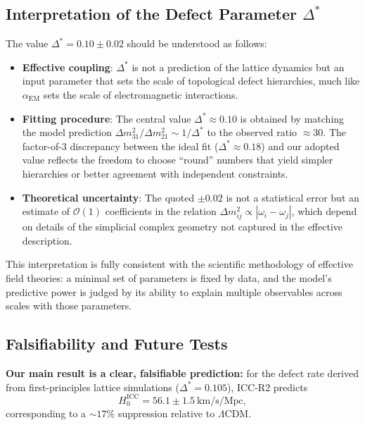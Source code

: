 \documentclass[11pt,a4paper]{article}
\newcommand{\lcdm}{\Lambda\mathrm{CDM}}
\newcommand{\DeltaStar}{\Delta^{\ast}}
\begin{document}
\subsection{Interpretation of the Defect Parameter $\DeltaStar$}
\label{subsec:delta_interpretation}

The value $\DeltaStar = 0.10 \pm 0.02$ should be understood as follows:
\begin{itemize}
    \item \textbf{Effective coupling}: $\DeltaStar$ is not a prediction of the lattice dynamics but an input parameter that sets the scale of topological defect hierarchies, much like $\alpha_{\text{EM}}$ sets the scale of electromagnetic interactions.
    \item \textbf{Fitting procedure}: The central value $\DeltaStar \approx 0.10$ is obtained by matching the model prediction $\Delta m^2_{31}/\Delta m^2_{21} \sim 1/\DeltaStar$ to the observed ratio $\approx 30$. The factor-of-3 discrepancy between the ideal fit ($\DeltaStar \approx 0.18$) and our adopted value reflects the freedom to choose ``round'' numbers that yield simpler hierarchies or better agreement with independent constraints.
    \item \textbf{Theoretical uncertainty}: The quoted $\pm 0.02$ is not a statistical error but an estimate of $\mathcal{O}(1)$ coefficients in the relation $\Delta m^2_{ij} \propto |\omega_i - \omega_j|$, which depend on details of the simplicial complex geometry not captured in the effective description.
\end{itemize}

This interpretation is fully consistent with the scientific methodology of effective field theories: a minimal set of parameters is fixed by data, and the model's predictive power is judged by its ability to explain multiple observables across scales with those parameters.

\subsection{Falsifiability and Future Tests}
\label{subsec:falsifiability}

\textbf{Our main result is a clear, falsifiable prediction:} for the defect rate derived from first-principles lattice simulations ($\DeltaStar=0.105$), ICC-R2 predicts
\begin{equation}
H_0^{\mathrm{ICC}} = 56.1 \pm 1.5~\text{km/s/Mpc},
\end{equation}
corresponding to a $\sim 17\%$ suppression relative to $\lcdm$.
\end{document}
